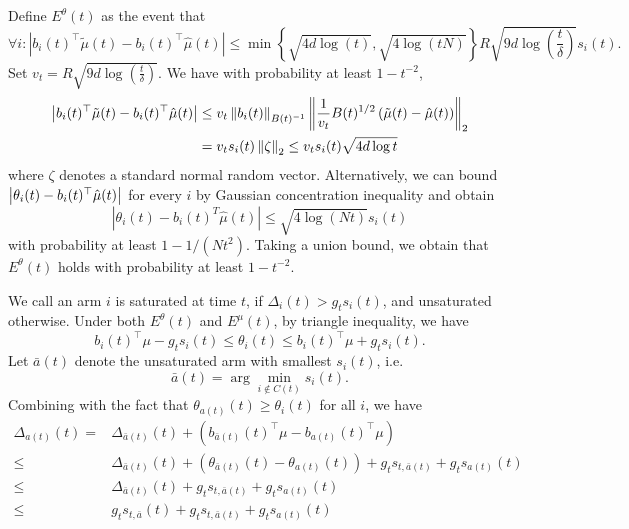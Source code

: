 \documentclass[letterpaper,11pt]{article}
\begin{document}
Define $E^{\theta}(t)$ as the event that 
\begin{equation*}
    \forall i:\left|b_i(t)^\top \tilde{\mu}(t)-b_i(t)^\top \hat{\mu}(t)\right| \leq \min \left\{\sqrt{4 d \log (t)}, \sqrt{4 \log (t N)}\right\} R \sqrt{9 d \log \left(\frac{t}{\delta}\right)} s_i(t) .
\end{equation*}
Set $v_t = R \sqrt{9 d \log \left(\frac{t}{\delta}\right)}$. 
We have with probability at least $1 - t^{-2}$, 
\begin{equation*}
\begin{aligned}
    \left|b_i(t)^\top \tilde{\mu}(t)-b_i(t)^\top \hat{\mu}(t)\right| &\leq v_t\left\|b_i(t)\right\|_{B(t)^{-1}} \left\|\frac{1}{v_t} B(t)^{1/2}\left(\tilde{\mu}(t) - \hat{\mu}(t)\right)\right\|_{2} \\
    &= v_t s_i(t) \left\|\zeta\right\|_2 \leq v_t s_i(t) \sqrt{4 d \log t} 
\end{aligned}
\end{equation*}
where $\zeta$ denotes a standard normal random vector. 
Alternatively, we can bound $\left|\theta_i(t) - b_i(t)^\top \hat{\mu}(t)\right|$ for every $i$ by Gaussian concentration inequality and obtain 
\begin{equation*}
    \left|\theta_i(t)-b_i(t)^T \hat{\mu}(t)\right| \leq \sqrt{4 \log (N t)} s_i(t)
\end{equation*}
with probability at least $1 - 1/(N t^2)$. Taking a union bound, we obtain that $E^{\theta}(t)$ holds with probability at least $1-t^{-2}$. 

We call an arm $i$ is saturated at time $t$, if $\Delta_i(t) > g_t s_i(t)$, and unsaturated otherwise. 
Under both $E^{\theta}(t)$ and $E^{\mu}(t)$, by triangle inequality, we have
\begin{equation*}
    b_i(t)^\top \mu - g_t s_i(t) \leq \theta_i(t) \leq b_i(t)^\top \mu + g_t s_i(t).
\end{equation*}
Let $\bar{a}(t)$ denote the unsaturated arm with smallest $s_i(t)$, i.e.
$$
\bar{a}(t)=\arg \min _{i \notin C(t)} s_i(t).
$$
Combining with the fact that $\theta_{a(t)}(t) \geq \theta_i(t)$ for all $i$, we have 
$$
\begin{aligned}
\Delta_{a(t)}(t)= & \Delta_{\bar{a}(t)}(t)+\left(b_{\bar{a}(t)}(t)^\top \mu-b_{a(t)}(t)^\top \mu\right) \\
\leq & \Delta_{\bar{a}(t)}(t)+\left(\theta_{\bar{a}(t)}(t)-\theta_{a(t)}(t)\right) +g_t s_{t, \bar{a}(t)}+g_t s_{a(t)}(t) \\
\leq & \Delta_{\bar{a}(t)}(t)+g_t s_{t, \bar{a}(t)}+g_t s_{a(t)}(t) \\
\leq & g_t s_{t, \bar{a}}(t)+g_t s_{t, \bar{a}(t)}+g_t s_{a(t)}(t)
\end{aligned}
$$
\end{document}
